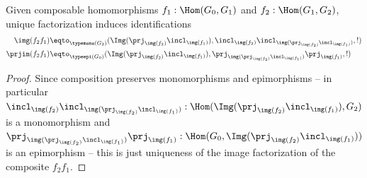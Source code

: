 \begin{lemma}
  Given composable homomorphisms $f_1:\Hom(G_0,G_1)$ and $f_2:\Hom(G_1,G_2)$, unique factorization induces identifications
  \begin{align*}
    \img(f_2f_1)&\eqto _{\typemono(G_2)}(\Img(\prj_{\img(f_2)}\incl_{\img(f_1)}),\incl_{\img(f_2)}\incl_{\img(\prj_{\img(f_2)}\incl_{\img(f_1)})},!)\\
    \prjim(f_2f_1)&\eqto _{\typeepi(G_0)}(\Img(\prj_{\img(f_2)}\incl_{\img(f_1)}),
  \prj_{\img(\prj_{\img(f_2)}\incl_{\img(f_1)})}\prj_{\img(f_1)},!)\\%
  \end{align*}
  
  
\end{lemma}
\begin{proof}
  Since composition preserves monomorphisms and epimorphisms
  -- in particular
  $\incl_{\img(f_2)} \incl_{\img(\prj_{\img(f_2)}\incl_{\img(f_1)})}:\Hom(\Img(\prj_{\img(f_2)}\incl_{\img(f_1)}),G_2)$ is a monomorphism and
  $\prj_{\img(\prj_{\img(f_2)}\incl_{\img(f_1)})} \prj_{\img(f_1)}:\Hom(G_0,\Img(\prj_{\img(f_2)}\incl_{\img(f_1)}))$ is an epimorphism --
  this is just uniqueness of the image factorization of the composite $f_2f_1$.
\end{proof}


